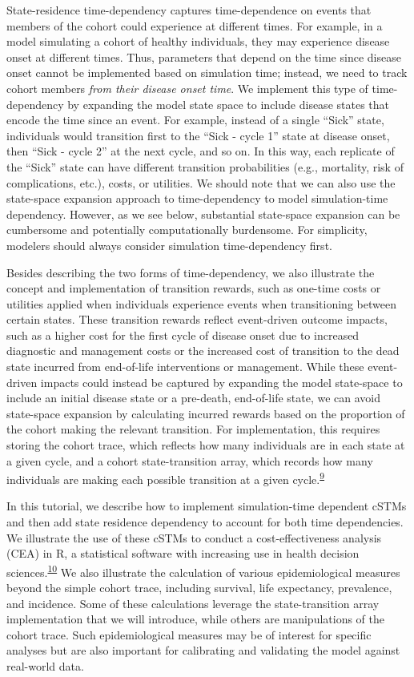\documentclass[
]{article}
\begin{document}
State-residence time-dependency captures time-dependence on events that members of the cohort could experience at different times. For example, in a model simulating a cohort of healthy individuals, they may experience disease onset at different times. Thus, parameters that depend on the time since disease onset cannot be implemented based on simulation time; instead, we need to track cohort members \emph{from their disease onset time}. We implement this type of time-dependency by expanding the model state space to include disease states that encode the time since an event. For example, instead of a single ``Sick'' state, individuals would transition first to the ``Sick - cycle 1'' state at disease onset, then ``Sick - cycle 2'' at the next cycle, and so on. In this way, each replicate of the ``Sick'' state can have different transition probabilities (e.g., mortality, risk of complications, etc.), costs, or utilities. We should note that we can also use the state-space expansion approach to time-dependency to model simulation-time dependency. However, as we see below, substantial state-space expansion can be cumbersome and potentially computationally burdensome. For simplicity, modelers should always consider simulation time-dependency first.

Besides describing the two forms of time-dependency, we also illustrate the concept and implementation of transition rewards, such as one-time costs or utilities applied when individuals experience events when transitioning between certain states. These transition rewards reflect event-driven outcome impacts, such as a higher cost for the first cycle of disease onset due to increased diagnostic and management costs or the increased cost of transition to the dead state incurred from end-of-life interventions or management. While these event-driven impacts could instead be captured by expanding the model state-space to include an initial disease state or a pre-death, end-of-life state, we can avoid state-space expansion by calculating incurred rewards based on the proportion of the cohort making the relevant transition. For implementation, this requires storing the cohort trace, which reflects how many individuals are in each state at a given cycle, and a cohort state-transition array, which records how many individuals are making each possible transition at a given cycle.\textsuperscript{\protect\hyperlink{ref-Krijkamp2019}{9}}

In this tutorial, we describe how to implement simulation-time dependent cSTMs and then add state residence dependency to account for both time dependencies. We illustrate the use of these cSTMs to conduct a cost-effectiveness analysis (CEA) in R, a statistical software with increasing use in health decision sciences.\textsuperscript{\protect\hyperlink{ref-Jalal2017b}{10}} We also illustrate the calculation of various epidemiological measures beyond the simple cohort trace, including survival, life expectancy, prevalence, and incidence. Some of these calculations leverage the state-transition array implementation that we will introduce, while others are manipulations of the cohort trace. Such epidemiological measures may be of interest for specific analyses but are also important for calibrating and validating the model against real-world data.
\end{document}
